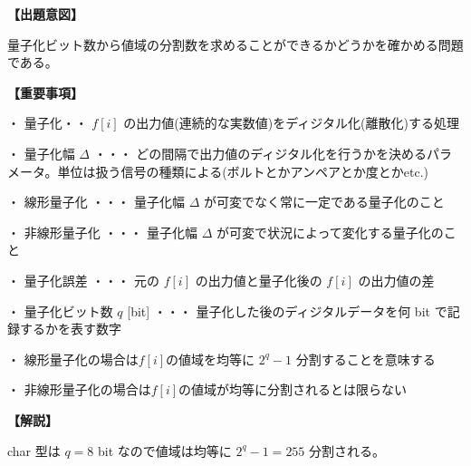 \noindent \textbf{【出題意図】}

\noindent 量子化ビット数から値域の分割数を求めることができるかどうかを確かめる問題である。

\vspace{1em}
\noindent \textbf{【重要事項】}

\medskip
\noindent ・ 量子化・・ $f[i]$ の出力値(連続的な実数値)をディジタル化(離散化)する処理

\medskip
\noindent ・ 量子化幅 $\Delta$ ・・・ どの間隔で出力値のディジタル化を行うかを決めるパラメータ。単位は扱う信号の種類による(ボルトとかアンペアとか度とかetc.)

\medskip
\noindent ・ 線形量子化 ・・・ 量子化幅  $\Delta$ が可変でなく常に一定である量子化のこと

\medskip
\noindent ・ 非線形量子化 ・・・ 量子化幅  $\Delta$ が可変で状況によって変化する量子化のこと

\medskip
\noindent ・ 量子化誤差 ・・・ 元の $f[i]$ の出力値と量子化後の $f[i]$ の出力値の差

\medskip
\noindent ・ 量子化ビット数 $q$ [bit] ・・・ 量子化した後のディジタルデータを何 bit で記録するかを表す数字

\medskip
\noindent ・ 線形量子化の場合は$f[i]$の値域を均等に $2^q-1$ 分割することを意味する

\medskip
\noindent ・ 非線形量子化の場合は$f[i]$の値域が均等に分割されるとは限らない

\vspace{1em}
\noindent \textbf{【解説】}

\noindent char 型は $q=8$ bit なので値域は均等に $2^q-1=255$ 分割される。

